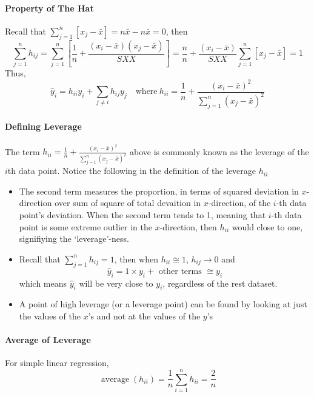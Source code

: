 \documentclass[11pt]{article}
\begin{document}
\paragraph{Property of The Hat}
Recall that $\sum_{j=1}^{n}\left[x_{j}-\bar{x}\right]=n\bar{x} - n\bar{x}=0$, then
\begin{equation*}
    \sum_{j=1}^{n} h_{i j}=\sum_{j=1}^{n}\left[\frac{1}{n}+\frac{\left(x_{i}-\bar{x}\right)\left(x_{j}-\bar{x}\right)}{S X X}\right]=\frac{n}{n}+\frac{\left(x_{i}-\bar{x}\right)}{S X X} \sum_{j=1}^{n}\left[x_{j}-\bar{x}\right]=1
\end{equation*}
Thus,
\begin{equation*}
    \hat{y}_{i}=h_{i i} y_{i}+\sum_{j \neq i} h_{i j} y_{j} \quad \text{where}~h_{i i}=\frac{1}{n}+\frac{\left(x_{i}-\bar{x}\right)^{2}}{\sum_{j=1}^{n}\left(x_{j}-\bar{x}\right)^{2}}
\end{equation*}
\paragraph{Defining Leverage} 
The term $h_{i i}=\frac{1}{n}+\frac{\left(x_{i}-\bar{x}\right)^{2}}{\sum_{j=1}^{n}\left(x_{j}-\bar{x}\right)^{2}}$ above is commonly known as the leverage of the $i$th data point. Notice the following in the definition of the leverage $h_{ii}$
\begin{itemize}
    \item The second term measures the proportion, in terms of squared deviation in $x$-direction over sum of square of total devaition in $x$-direction, of the $i$-th data point's deviation. When the second term tends to 1, meaning that $i$-th data point is some extreme outlier in the $x$-direction, then $h_{ii}$ would close to one, signifiying the `leverage'-ness. 
    \item Recall that $\sum_{j=1}^{n} h_{i j}=1$, then when $h_{i i} \cong 1$, $h_{ij}\rightarrow 0$ and
        \begin{equation*}
            \hat{y}_{i}=1 \times y_{i}+\text { other terms } \cong y_{i}
        \end{equation*}
    which means $\hat{y}_{i}$  will be very close to $y_i$, regardless of the rest dataset. 
    \item A point of high leverage (or a leverage point) can be found by looking at just the values of the $x$’s and not at the values of the $y$’s
\end{itemize}

\paragraph{Average of Leverage} For simple linear regression, 
\begin{equation*}
    \operatorname{average}\left(h_{i i}\right) = \frac{1}{n}\sum_{i = 1}^n h_{ii} =\frac{2}{n}
\end{equation*}
\end{document}
